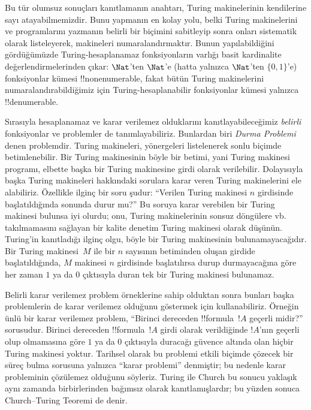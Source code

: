 \documentclass[../../../include/open-logic-section]{subfiles}
\begin{document}
Bu tür olumsuz sonuçları kanıtlamanın anahtarı, Turing makinelerinin
kendilerine sayı atayabilmemizdir. Bunu yapmanın en kolay yolu, belki Turing
makinelerini ve programlarını yazmanın belirli bir biçimini sabitleyip sonra
onları sistematik olarak listeleyerek, makineleri numaralandırmaktır. Bunun
yapılabildiğini gördüğümüzde Turing-hesaplanamaz fonksiyonların varlığı basit
kardinalite değerlendirmelerinden çıkar: $\Nat$'ten $\Nat$'e (hatta yalnızca
$\Nat$'ten $\{0,1\}$'e) fonksiyonlar kümesi !!{nonenumerable}, fakat bütün
Turing makinelerini numaralandırabildiğimiz için Turing-hesaplanabilir
fonksiyonlar kümesi yalnızca !!{denumerable}.

Sırasıyla hesaplanamaz ve karar verilemez olduklarını kanıtlayabileceğimiz
\emph{belirli} fonksiyonlar ve problemler de tanımlayabiliriz. Bunlardan biri
\emph{Durma Problemi} denen problemdir. Turing makineleri, yönergeleri
listelenerek sonlu biçimde betimlenebilir. Bir Turing makinesinin böyle bir
betimi, yani Turing makinesi programı, elbette başka bir Turing makinesine
girdi olarak verilebilir. Dolayısıyla başka Turing makineleri hakkındaki
sorulara karar veren Turing makinelerini ele alabiliriz. Özellikle ilginç bir
soru şudur: ``Verilen Turing makinesi $n$ girdisinde başlatıldığında sonunda
durur mu?'' Bu soruya karar verebilen bir Turing makinesi bulunsa iyi olurdu;
onu, Turing makinelerinin sonsuz döngülere vb. takılmamasını sağlayan bir
kalite denetim Turing makinesi olarak düşünün. Turing'in kanıtladığı ilginç
olgu, böyle bir Turing makinesinin bulunamayacağıdır. Bir Turing makinesi~$M$
ile bir $n$ sayısının betiminden oluşan girdide başlatıldığında, $M$ makinesi
$n$ girdisinde başlatılırsa durup durmayacağına göre her zaman $1$ ya da $0$
çıktısıyla duran tek bir Turing makinesi bulunamaz.

Belirli karar verilemez problem örneklerine sahip olduktan sonra bunları başka
problemlerin de karar verilemez olduğunu göstermek için kullanabiliriz.
Örneğin ünlü bir karar verilemez problem, ``Birinci dereceden
!!{formula}~$!A$ geçerli midir?'' sorusudur. Birinci dereceden
!!{formula}~$!A$ girdi olarak verildiğinde $!A$'nın geçerli olup olmamasına
göre $1$ ya da $0$ çıktısıyla duracağı güvence altında olan hiçbir Turing
makinesi yoktur. Tarihsel olarak bu problemi etkili biçimde çözecek bir süreç
bulma sorusuna yalnızca ``karar problemi'' denmiştir; bu nedenle karar
probleminin çözülemez olduğunu söyleriz. Turing ile Church bu sonucu yaklaşık
aynı zamanda birbirlerinden bağımsız olarak kanıtlamışlardır; bu yüzden sonuca
Church--Turing Teoremi de denir.
\end{document}
